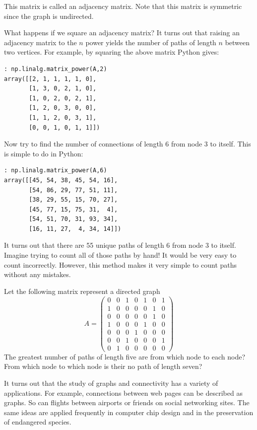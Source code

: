 This matrix is called an adjacency matrix.
Note that this matrix is symmetric since the graph is undirected.

What happens if we square an adjacency matrix?
It turns out that raising an adjacency matrix to the $n$ power yields the number of paths of length $n$ between two vertices.
For example, by squaring the above matrix Python gives:
\begin{lstlisting}[style=python]
: np.linalg.matrix_power(A,2)
array([[2, 1, 1, 1, 1, 0],
       [1, 3, 0, 2, 1, 0],
       [1, 0, 2, 0, 2, 1],
       [1, 2, 0, 3, 0, 0],
       [1, 1, 2, 0, 3, 1],
       [0, 0, 1, 0, 1, 1]])
\end{lstlisting}

Now try to find the number of connections of length 6 from node 3 to itself.
This is simple to do in Python:
\begin{lstlisting}[style=python]
: np.linalg.matrix_power(A,6)
array([[45, 54, 38, 45, 54, 16],
       [54, 86, 29, 77, 51, 11],
       [38, 29, 55, 15, 70, 27],
       [45, 77, 15, 75, 31,  4],
       [54, 51, 70, 31, 93, 34],
       [16, 11, 27,  4, 34, 14]])
\end{lstlisting}
It turns out that there are 55 unique paths of length 6 from node 3 to itself.
Imagine trying to count all of those paths by hand!
It would be very easy to count incorrectly.
However, this method makes it very simple to count paths without any mistakes.

\begin{problem}
Let the following matrix represent a directed graph
\[
A = \begin{pmatrix}
0 & 0 & 1 & 0 & 1 & 0 & 1\\
1 & 0 & 0 & 0 & 0 & 1 & 0\\
0 & 0 & 0 & 0 & 0 & 1 & 0\\
1 & 0 & 0 & 0 & 1 & 0 & 0\\
0 & 0 & 0 & 1 & 0 & 0 & 0\\
0 & 0 & 1  & 0 & 0& 0 & 1\\
0 & 1 & 0 & 0 & 0 & 0 & 0
\end{pmatrix}
\]
The greatest number of paths of length five are from which node to each node?
From which node to which node is their no path of length seven?
\end{problem}

It turns out that the study of graphs and connectivity has a variety of applications.
For example, connections between web pages can be described as graphs.
So can flights between airports or friends on social networking sites.
The same ideas are applied frequently in computer chip design and in the preservation of endangered species.

